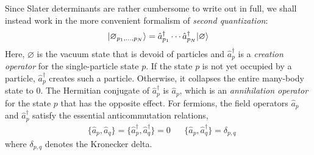 Since Slater determinants are rather cumbersome to write out in full, we shall
instead work in the more convenient formalism of \textit{second quantization}:
\begin{align*}
  | \varnothing_{p_1, \ldots, p_N} \rangle =
  \hat a_{p_1}^\dagger \cdots \hat a_{p_N}^\dagger | \varnothing \rangle
\end{align*}
Here, $\varnothing$ is the vacuum state that is devoid of particles and
$\hat a_p^\dagger$ is a \textit{creation operator} for the single-particle
state $p$.  If the state $p$ is not yet occupied by a particle,
$\hat a_p^\dagger$ creates such a particle.  Otherwise, it collapses the
entire many-body state to $0$.  The Hermitian conjugate of $\hat a_p^\dagger$
is $\hat a_p$, which is an \textit{annihilation operator} for the state $p$
that has the opposite effect.  For fermions, the field operators $\hat a_p$
and $\hat a_p^\dagger$ satisfy the essential anticommutation relations,
\begin{align*}
  &\{\hat a_p, \hat a_q\} = \{\hat a_p^\dagger, \hat a_q^\dagger\} = 0 &
  &\{\hat a_p, \hat a_q^\dagger\} = \delta_{p, q}
\end{align*}
where $\delta_{p, q}$ denotes the Kronecker delta.

